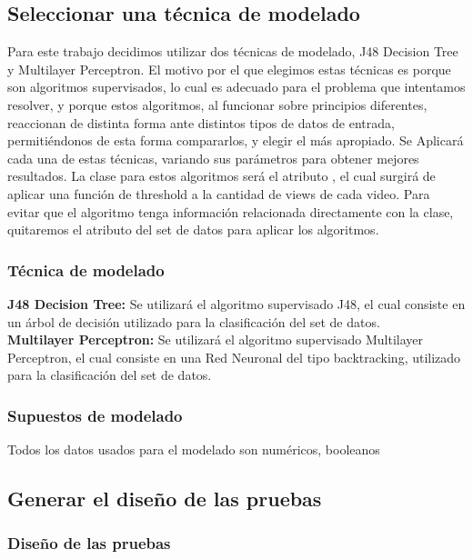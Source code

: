\subsection{Seleccionar una técnica de modelado}

Para este trabajo decidimos utilizar dos técnicas de modelado, J48 Decision Tree
y Multilayer Perceptron. El motivo por el que elegimos estas técnicas es porque
son algoritmos supervisados, lo cual es adecuado para el problema que intentamos
resolver, y porque estos algoritmos, al funcionar sobre principios diferentes,
reaccionan de distinta forma ante distintos tipos de datos de entrada,
permitiéndonos de esta forma compararlos, y elegir el más apropiado.
Se Aplicará cada una de estas técnicas, variando sus parámetros
para obtener mejores resultados.
La clase para estos algoritmos será el atributo , el cual
surgirá de aplicar una función de threshold a la cantidad de views de cada
video. Para evitar que el algoritmo tenga información relacionada directamente
con la clase, quitaremos el atributo  del set de datos para aplicar
los algoritmos.

    \subsubsection{Técnica de modelado}
      \textbf{J48 Decision Tree:} Se utilizará el algoritmo supervisado J48, el cual
      consiste en un árbol de decisión utilizado para la clasificación del set
      de datos.\\
      \textbf{Multilayer Perceptron:} Se utilizará el algoritmo supervisado
      Multilayer Perceptron, el cual consiste en una Red Neuronal del tipo
      backtracking, utilizado para la clasificación del set de datos.

    \subsubsection{Supuestos de modelado}
        Todos los datos usados para el modelado son numéricos, booleanos

\subsection{Generar el diseño de las pruebas}
    \subsubsection{Diseño de las pruebas}


